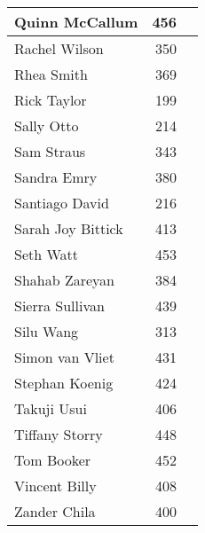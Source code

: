 \documentclass[]{article}
\begin{document}
\begin{longtable}{lrl}
   \hline
Quinn McCallum & 456 &  \\ 
   \hline
Rachel Wilson & 350 &  \\ 
   \hline
Rhea Smith & 369 &  \\ 
   \hline
Rick Taylor & 199 &  \\ 
   \hline
Sally Otto & 214 &  \\ 
   \hline
Sam Straus & 343 &  \\ 
   \hline
Sandra Emry & 380 &  \\ 
   \hline
Santiago David & 216 &  \\ 
   \hline
Sarah Joy Bittick & 413 &  \\ 
   \hline
Seth Watt & 453 &  \\ 
   \hline
Shahab Zareyan & 384 &  \\ 
   \hline
Sierra Sullivan & 439 &  \\ 
   \hline
Silu Wang & 313 &  \\ 
   \hline
Simon van Vliet & 431 &  \\ 
   \hline
Stephan Koenig & 424 &  \\ 
   \hline
Takuji Usui & 406 &  \\ 
   \hline
Tiffany Storry & 448 &  \\ 
   \hline
Tom Booker & 452 &  \\ 
   \hline
Vincent Billy & 408 &  \\ 
   \hline
Zander Chila & 400 &  \\ 
   \hline
\hline
\end{longtable}
\end{document}
